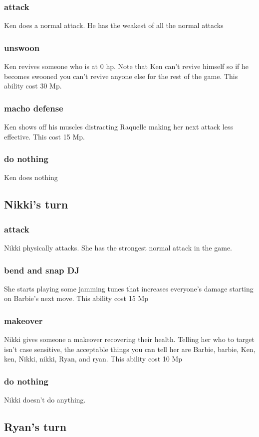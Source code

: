 \documentclass[a4paper]{article}
\begin{document}
\subsubsection{attack}
Ken does a normal attack. He has the weakest of all the normal attacks
\subsubsection{unswoon}
Ken revives someone who is at 0 hp. Note that Ken can't revive himself so if he becomes swooned you can't revive anyone else for the rest of the game. This ability cost 30 Mp.
\subsubsection{macho defense}
Ken shows off his muscles distracting Raquelle making her next attack less effective. This cost 15 Mp.
\subsubsection{do nothing}
Ken does nothing
\subsection{Nikki's turn}
\subsubsection{attack}
Nikki physically attacks. She has the strongest normal attack in the game. 
\subsubsection{bend and snap DJ}
She starts playing some jamming tunes that increases everyone's damage starting on Barbie's next move. This ability cost 15 Mp
\subsubsection{makeover}
Nikki gives someone a makeover recovering their health. Telling her who to target isn't case sensitive, the acceptable things you can tell her are Barbie, barbie, Ken, ken, Nikki, nikki, Ryan, and ryan. This ability cost 10 Mp 
\subsubsection{do nothing}
Nikki doesn't do anything.
\subsection{Ryan's turn}
\end{document}
